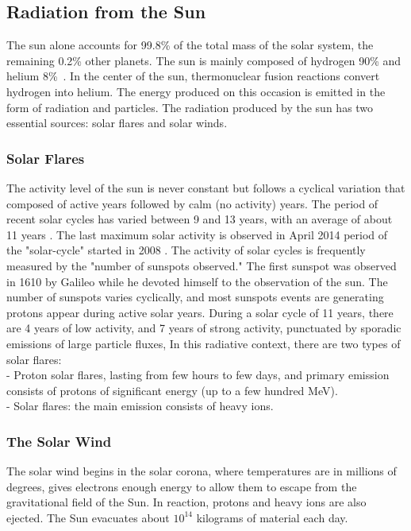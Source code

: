 \subsection{Radiation from the Sun} 

The sun alone accounts for 99.8\% of the total mass of the solar system, the remaining 0.2\% other planets. The sun is mainly composed of hydrogen 90\% and helium 8\%~\citep{wikisun}. In the center of the sun, thermonuclear fusion reactions convert hydrogen into helium. The energy produced on this occasion is emitted in the form of radiation and particles. The radiation produced by the sun has two essential sources: solar flares and solar winds. 

\subsubsection{Solar Flares} 

The activity level of the sun is never constant but follows a cyclical variation that composed of active years followed by calm (no activity) years. The period of recent solar cycles has
varied between 9 and 13 years, with an average of about 11 years \citep{nasa}. The last maximum solar activity is observed in April 2014 period of the "solar-cycle" started in 2008 \citep{nasa}. The activity of solar cycles is frequently measured by the "number of sunspots observed." The first sunspot was observed in 1610 by Galileo while he devoted himself to the observation of the sun. The number of sunspots varies cyclically, and most sunspots events are
generating protons appear during active solar years. During a solar cycle of 11 years, there are 4 years of low activity, and 7 years of strong activity, punctuated by sporadic emissions of large particle fluxes, In this radiative context, there are two types of solar flares: \\
- Proton solar flares, lasting from few hours to few days, and primary emission consists of protons of significant energy (up to
a few hundred MeV). \\
- Solar flares: the main emission consists of heavy ions.

\subsubsection{The Solar Wind}

The solar wind begins in the solar corona, where temperatures are in millions of degrees, gives electrons enough energy to allow them to
escape from the gravitational field of the Sun. In reaction, protons and heavy ions are also ejected. The Sun evacuates about $10^{14}$ kilograms of material each day. 


